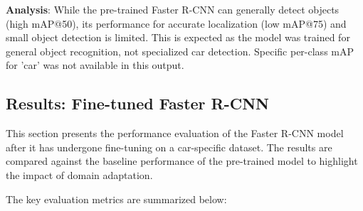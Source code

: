 \documentclass[12pt,a4paper]{article}
\begin{document}
\textbf{Analysis}: While the pre-trained Faster R-CNN can generally detect objects (high mAP@50), its performance for accurate localization (low mAP@75) and small object detection is limited. This is expected as the model was trained for general object recognition, not specialized car detection. Specific per-class mAP for 'car' was not available in this output.

\subsection{Results: Fine-tuned Faster R-CNN}
\label{ssec:results_fasterrcnn_finetuned}

This section presents the performance evaluation of the Faster R-CNN model after it has undergone fine-tuning on a car-specific dataset. The results are compared against the baseline performance of the pre-trained model to highlight the impact of domain adaptation.

The key evaluation metrics are summarized below:
\end{document}

